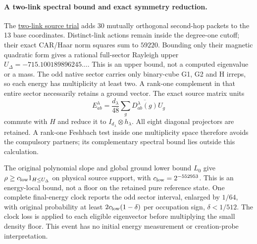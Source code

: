 \paragraph{A two-link spectral bound and exact symmetry reduction.}
The \href{https://github.com/FloatingPragma/observer-patch-holography/blob/main/model/particle_primary_branch_certificate/PROOF.md}{two-link source trial}
adds 30 mutually orthogonal second-hop packets to the 13 base
coordinates. Distinct-link actions remain inside the degree-one cutoff;
their exact CAR/Haar norm squares sum to $59220$. Bounding only their
magnetic quadratic form gives a rational full-sector Rayleigh upper
$U_\Delta=-715.100189896245\ldots$.
This is an upper bound, not a computed eigenvalue or a mass.
The odd native sector carries only binary-cube G1, G2 and H irreps,
so each energy has multiplicity at least two. A rank-one complement
in that entire sector necessarily retains a ground vector. The exact
source matrix units
\[
 E^\lambda_{ab}=\frac{d_\lambda}{48}
  \sum_g\overline{D^\lambda_{ab}(g)}U_g
\]
commute with $H$ and reduce it to $I_{d_\lambda}\otimes h_\lambda$.
All eight diagonal projectors are retained. A rank-one Feshbach test
inside one multiplicity space therefore avoids the compulsory partners;
its complementary spectral bound lies outside this calculation.

The original polynomial slope and global ground lower bound $L_0$ give
$\rho\ge c_{\rm low}1_{H\le U_\Delta}$ on physical source support, with
$c_{\rm low}=2^{-552953}$. This is an energy-local bound, not a floor on
the retained pure reference state. One complete final-energy clock
reports the odd sector interval, enlarged by $1/64$, with original
probability at least $2c_{\rm low}(1-\delta)$ per occupation sign,
$\delta<1/512$. The clock loss is applied to each eligible eigenvector
before multiplying the small density floor. This event has no initial
energy measurement or creation-probe interpretation.

